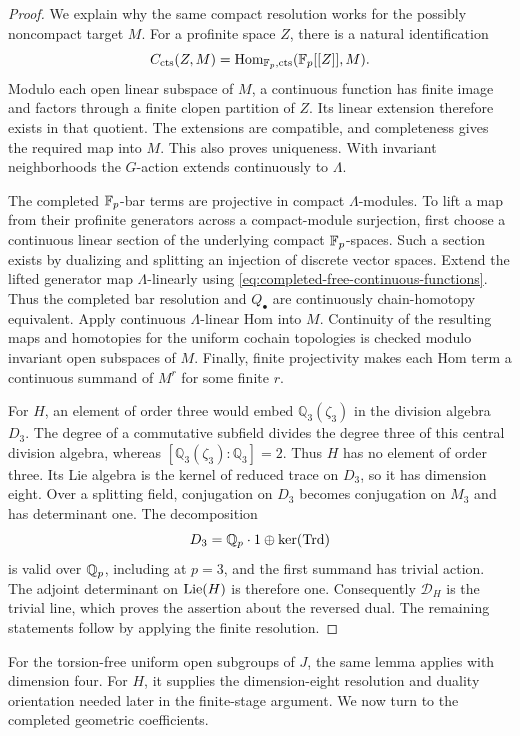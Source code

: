 \begin{proof}
We explain why the same compact resolution works for the possibly
noncompact target $M$.  For a profinite space $Z$, there is a natural
identification
\begin{equation}
 \label{eq:completed-free-continuous-functions}
 C_{\mathrm{cts}}(Z,M)
 =\operatorname{Hom}_{\mathbb F_p,\mathrm{cts}}(\mathbb F_p[[Z]],M).
\end{equation}
Modulo each open linear subspace of $M$, a continuous function has
finite image and factors through a finite clopen partition of $Z$.
Its linear extension therefore exists in that quotient.  The extensions
are compatible, and completeness gives the required map into $M$.
This also proves uniqueness.  With invariant neighborhoods the
$G$-action extends continuously to $\Lambda$.

The completed $\mathbb F_p$-bar terms are projective in compact
$\Lambda$-modules.  To lift a map from their profinite generators across
a compact-module surjection, first choose a continuous linear section
of the underlying compact $\mathbb F_p$-spaces.  Such a section exists by
dualizing and splitting an injection of discrete vector spaces.
Extend the lifted generator map $\Lambda$-linearly using
\eqref{eq:completed-free-continuous-functions}.  Thus the completed bar
resolution and $Q_\bullet$ are continuously chain-homotopy equivalent.
Apply continuous $\Lambda$-linear Hom into $M$.  Continuity of the
resulting maps and homotopies for the uniform cochain topologies is
checked modulo invariant open subspaces of $M$.  Finally, finite
projectivity makes each Hom term a continuous summand of $M^r$ for
some finite $r$.

For $H$, an element of order three would embed
$\mathbb Q_3(\zeta_3)$ in the division algebra $D_3$.  The degree of a
commutative subfield divides the degree three of this central division
algebra, whereas $[\mathbb Q_3(\zeta_3):\mathbb Q_3]=2$.  Thus $H$ has
no element of order three.  Its Lie algebra is the kernel of reduced
trace on $D_3$, so it has dimension eight.  Over a splitting field,
conjugation on $D_3$ becomes conjugation on $M_3$ and has determinant
one.  The decomposition
\[
 D_3=\mathbb Q_p\cdot1\oplus\ker(\operatorname{Trd})
\]
is valid over $\mathbb Q_p$, including at $p=3$, and the first summand has
trivial action.  The adjoint determinant on $\operatorname{Lie}(H)$ is therefore one.
Consequently $\mathcal D_H$ is the trivial line, which proves the
assertion about the reversed dual.  The remaining statements follow
by applying the finite resolution.
\end{proof}

For the torsion-free uniform open subgroups of \(J\), the same lemma
applies with dimension four. For \(H\), it supplies the dimension-eight
resolution and duality orientation needed later in the finite-stage
argument. We now turn to the completed geometric coefficients.
